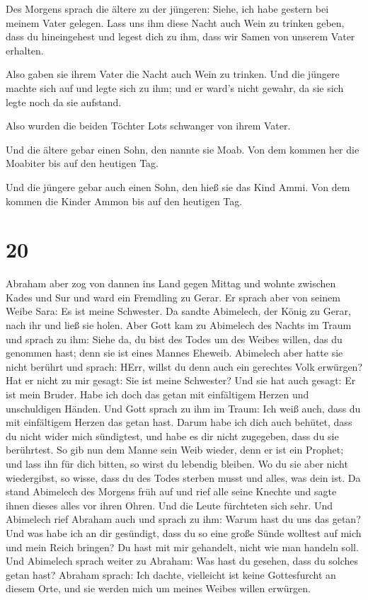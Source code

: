  Des Morgens sprach die ältere zu der jüngeren: Siehe, ich
habe gestern bei meinem Vater gelegen. Lass uns ihm diese Nacht auch
Wein zu trinken geben, dass du hineingehest und legest dich zu ihm, dass
wir Samen von unserem Vater erhalten.

 Also gaben sie ihrem Vater die Nacht auch Wein zu trinken.
Und die jüngere machte sich auf und legte sich zu ihm; und er ward's
nicht gewahr, da sie sich legte noch da sie aufstand.

 Also wurden die beiden Töchter Lots schwanger von ihrem
Vater.

 Und die ältere gebar einen Sohn, den nannte sie Moab. Von
dem kommen her die Moabiter bis auf den heutigen Tag.

 Und die jüngere gebar auch einen Sohn, den hieß sie das
Kind Ammi. Von dem kommen die Kinder Ammon bis auf den heutigen Tag.

\hypertarget{section-2}{%
\section{20}\label{section-2}}

 Abraham aber zog von dannen ins Land gegen Mittag und
wohnte zwischen Kades und Sur und ward ein Fremdling zu Gerar.
 Er sprach aber von seinem Weibe Sara: Es ist meine
Schwester. Da sandte Abimelech, der König zu Gerar, nach ihr und ließ
sie holen.  Aber Gott kam zu Abimelech des Nachts im Traum
und sprach zu ihm: Siehe da, du bist des Todes um des Weibes willen, das
du genommen hast; denn sie ist eines Mannes Eheweib. 
Abimelech aber hatte sie nicht berührt und sprach: HErr, willst du denn
auch ein gerechtes Volk erwürgen?  Hat er nicht zu mir
gesagt: Sie ist meine Schwester? Und sie hat auch gesagt: Er ist mein
Bruder. Habe ich doch das getan mit einfältigem Herzen und unschuldigen
Händen.  Und Gott sprach zu ihm im Traum: Ich weiß auch,
dass du mit einfältigem Herzen das getan hast. Darum habe ich dich auch
behütet, dass du nicht wider mich sündigtest, und habe es dir nicht
zugegeben, dass du sie berührtest.  So gib nun dem Manne
sein Weib wieder, denn er ist ein Prophet; und lass ihn für dich bitten,
so wirst du lebendig bleiben. Wo du sie aber nicht wiedergibst, so
wisse, dass du des Todes sterben musst und alles, was dein ist.
 Da stand Abimelech des Morgens früh auf und rief alle seine
Knechte und sagte ihnen dieses alles vor ihren Ohren. Und die Leute
fürchteten sich sehr.  Und Abimelech rief Abraham auch und
sprach zu ihm: Warum hast du uns das getan? Und was habe ich an dir
gesündigt, dass du so eine große Sünde wolltest auf mich und mein Reich
bringen? Du hast mit mir gehandelt, nicht wie man handeln soll.
 Und Abimelech sprach weiter zu Abraham: Was hast du
gesehen, dass du solches getan hast?  Abraham sprach: Ich
dachte, vielleicht ist keine Gottesfurcht an diesem Orte, und sie werden
mich um meines Weibes willen erwürgen.

